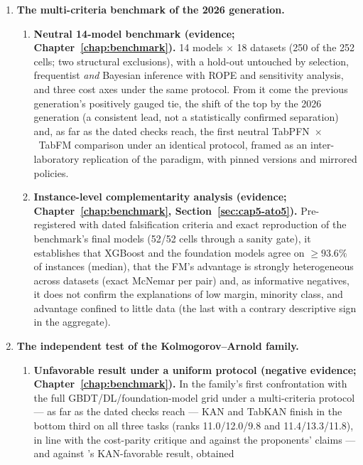 \begin{enumerate}
  \item \textbf{The multi-criteria benchmark of the 2026 generation.}
  \begin{enumerate}
  \item \textbf{Neutral 14-model benchmark (evidence;
    Chapter~\ref{chap:benchmark}).} 14 models $\times$ 18 datasets
    (250 of the 252 cells; two structural exclusions), with a
    hold-out untouched by selection, frequentist \emph{and} Bayesian
    inference with ROPE and sensitivity analysis, and three cost
    axes under the same protocol. From it come the previous
    generation's positively gauged tie, the shift of the top by the 2026
    generation (a consistent lead, not a statistically confirmed
    separation) and, as far as the dated checks reach, the first
    neutral TabPFN~$\times$~TabFM comparison under an identical
    protocol, framed as an inter-laboratory replication of the
    paradigm, with pinned versions and mirrored policies.
  \item \textbf{Instance-level complementarity analysis (evidence;
    Chapter~\ref{chap:benchmark}, Section~\ref{sec:cap5-ato5}).}
    Pre-registered with dated falsification criteria and exact
    reproduction of the benchmark's final models (52/52 cells
    through a sanity gate), it establishes that XGBoost and the
    foundation models agree on ${\ge}93.6\%$ of instances (median),
    that the FM's advantage is strongly heterogeneous across
    datasets (exact McNemar per pair) and, as informative negatives,
    it does not confirm the explanations of low margin, minority
    class, and advantage confined to little data (the last with a
    contrary descriptive sign in the aggregate).
  \end{enumerate}
  \item \textbf{The independent test of the Kolmogorov--Arnold
    family.}
  \begin{enumerate}
  \item \textbf{Unfavorable result under a uniform protocol
    (negative evidence; Chapter~\ref{chap:benchmark}).} In the
    family's first confrontation with the full
    GBDT/DL/\allowbreak foundation-model grid under a multi-criteria protocol
    --- as far as the dated checks reach --- KAN and TabKAN finish
    in the bottom third on all three tasks (ranks 11.0/12.0/9.8 and
    11.4/13.3/11.8), in line with the cost-parity critique
    \citep{kancritical2024} and against the proponents' claims ---
    and against \citet{poeta2024}'s KAN-favorable result, obtained

\end{enumerate}
\end{enumerate}
